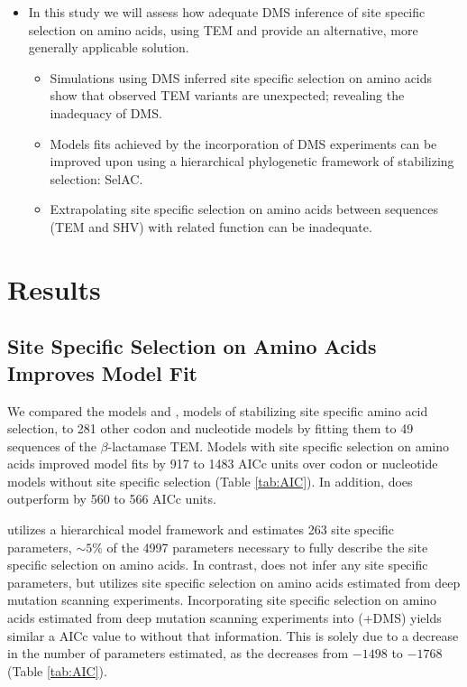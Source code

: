 \documentclass[12pt]{article}
\begin{document}
\begin{itemize}
\begin{itemize}
\begin{itemize}
		\end{itemize}
	\end{itemize}
	\item In this study we will assess how adequate DMS inference of site specific selection on amino acids, using TEM and provide an alternative, more generally applicable solution.
	\begin{itemize}
		\item Simulations using DMS inferred site specific selection on amino acids show that observed TEM variants are unexpected; revealing the inadequacy of DMS.
		\item Models fits achieved by the incorporation of DMS experiments can be improved upon using a hierarchical phylogenetic framework of stabilizing selection: SelAC.
		\item Extrapolating site specific selection on amino acids between sequences (TEM and SHV) with related function can be inadequate.
	\end{itemize}
\end{itemize}

\section*{Results}
\subsection*{Site Specific Selection on Amino Acids Improves Model Fit}
We compared the models \phydms \citep{hilton2017} and \selac \citep{beaulieu2018}, models of stabilizing site specific amino acid selection, to 281 other codon and nucleotide models by fitting them to 49 sequences of the $\beta$-lactamase TEM.
Models with site specific selection on amino acids improved model fits by 917 to 1483 AICc units over codon or nucleotide models without site specific selection (Table \ref{tab:AIC}).
In addition, \selac does outperform \phydms by 560 to  566 AICc units.

\selac utilizes a hierarchical model framework and estimates 263 site specific parameters, $\sim5\%$ of the 4997 parameters necessary to fully describe the site specific selection on amino acids.
In contrast, \phydms does not infer any site specific parameters, but utilizes site specific selection on amino acids estimated from deep mutation scanning experiments.
Incorporating site specific selection on amino acids estimated from deep mutation scanning experiments into \selac (\selac+DMS) yields similar a AICc value to \selac without that information.
This is solely due to a decrease in the number of parameters estimated, as the \LLik decreases from $-1498$ to $-1768$ (Table \ref{tab:AIC}).
\end{document}
